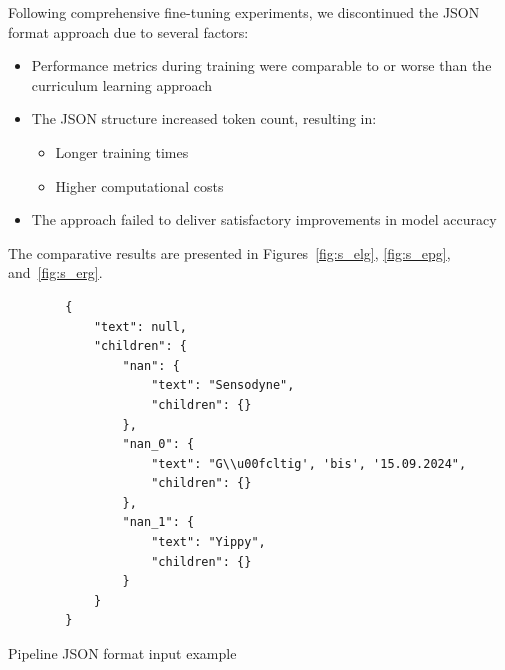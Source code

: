 \documentclass[licencjacka,en]{pracamgr}
\begin{document}
\begin{appendices}
Following comprehensive fine-tuning experiments, we discontinued the JSON format approach due to several factors:

\begin{itemize}
    \item Performance metrics during training were comparable to or worse than the curriculum learning approach
    \item The JSON structure increased token count, resulting in:
    \begin{itemize}
        \item Longer training times
        \item Higher computational costs
    \end{itemize}
    \item The approach failed to deliver satisfactory improvements in model accuracy
\end{itemize}

The comparative results are presented in Figures~\ref{fig:s_elg}, \ref{fig:s_epg}, and~\ref{fig:s_erg}.
\begin{center}
   \begin{listing}
        \begin{verbatim}
        {
            "text": null,
            "children": {
                "nan": {
                    "text": "Sensodyne",
                    "children": {}
                },
                "nan_0": {
                    "text": "G\\u00fcltig', 'bis', '15.09.2024",
                    "children": {}
                },
                "nan_1": {
                    "text": "Yippy",
                    "children": {}
                }
            }
        }
        \end{verbatim}
        \caption{Pipeline JSON format input example}
        \label{list:sel-json}
    \end{listing}
\end{center}


\end{appendices}
\end{document}
